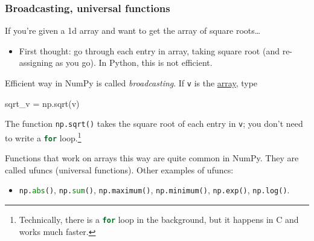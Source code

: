 \documentclass{beamer}
\newenvironment{codeblock}
    {\hfill\begin{beamerboxesrounded}[lower=codecol, width=0.8\textwidth]
    \medskip

    }
    { 
    \end{beamerboxesrounded}\hfill
    }
\theoremstyle{example}
\newcommand{\ct}[1]{\lstinline[language=Python,basicstyle=\ttfamily\footnotesize,stringstyle=\small\color{strings}]!#1!}
\begin{document}
\begin{frame}[fragile]
\frametitle{Broadcasting, universal functions}
If you're given a 1d array and want to get the array of square roots\ldots 
\vspace*{-6pt}
\begin{itemize}
    \pause
    \item First thought: go through each entry in array, taking square root (and re-assigning as you go). In Python, this is not efficient.
\end{itemize}

\vspace*{-6pt}
\pause
Efficient way in NumPy is called \emph{broadcasting}. If \ct{v} is the \underline{array}, type 

\begin{codeblock}

\begin{python}[numbers=none]
sqrt_v = np.sqrt(v)
\end{python}

\end{codeblock}

\vspace*{-4pt}
The function \ct{np.sqrt()} takes the square root of each entry in \ct{v}; you don't need to write a \ct{for} loop.\footnote{Technically, there is a \ct{for} loop in the background, but it happens in C and works much faster.}

\pause
\vspace*{-6pt}
Functions that work on arrays this way are quite common in NumPy. They are called {\ttb ufuncs} (universal functions). \pause Other examples of ufuncs: 
    \vspace*{-6pt}
    \begin{itemize}
        \item[] \ct{np.abs()}, \ct{np.sum()}, \ct{np.maximum()}, \ct{np.minimum()}, \ct{np.exp()}, \ct{np.log()}.
    \end{itemize}
\end{frame}
\end{document}
